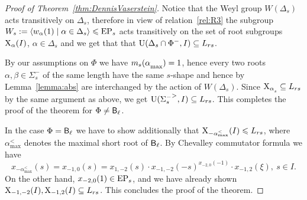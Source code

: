 \begin{proof}[Proof of Theorem~\ref{thm:DennisVaserstein}]
Notice that the Weyl group $W(\Delta_s)$ acts transitively on $\Delta_s$, therefore in view of relation~\ref{rel:R3} the subgroup
$W_s := \langle w_\alpha(1) \mid \alpha\in\Delta_s\rangle \leqslant \operatorname{EP}_s$ acts transitively on the set of root subgroups $\operatorname{X}_\alpha(I)$, $\alpha\in \Delta_s$
and we get that that $\operatorname{U}(\Delta_s \cap \Phi^-, I)\subseteq L_{rs}$.

By our assumptions on $\Phi$ we have $m_s(\alpha\ssub{\mathrm{max}})=1$, hence every two roots $\alpha, \beta \in \Sigma^-_s$ of the same length
have the same $s$-shape and
hence by Lemma~\ref{lemma:abs} are interchanged by the action of $W(\Delta_s)$. %
Since $\X_{\alpha\ssub{s}} \subseteq L_{rs}$ by the same argument as above, we get $\operatorname{U}({\Sigma^-_s}^>, I)\subseteq L_{rs}$.
This completes the proof of the theorem for $\Phi\neq \mathsf{B}_\ell$. 

In the case $\Phi=\mathsf{B}_\ell$ we have to show additionally that $\operatorname{X}_{-\alpha^<_{\mathrm{max}}}(I) \leqslant L_{rs}$, where $\alpha^<_{\mathrm{max}}$
denotes the maximal short root of $\mathsf{B}_\ell$.
By Chevalley commutator formula we have
\[ x_{-{\alpha^<_{\mathrm{max}}}}(s) = x_{-1,0}(s) = x_{1,-2}(s) \cdot x_{-1,-2}(-s)^{x_{-2, 0}(-1)} \cdot x_{-1, 2}(\xi),\ s\in I. \]
On the other hand, $x_{-2,0}(1) \in \operatorname{EP}_s$, and we have already shown $\operatorname{X}_{-1,-2}(I), \operatorname{X}_{-1, 2}(I) \subseteq L_{rs}$.
This concludes the proof of the theorem.
\end{proof}
